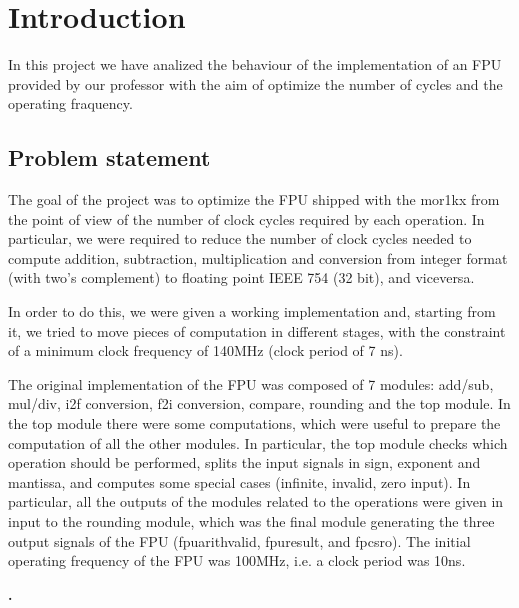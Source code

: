 \section{Introduction}
In this project we have analized the behaviour of the implementation of an FPU \cite{mor1kxcode} provided by our professor with the aim of optimize the number of cycles and the operating fraquency.


\subsection{Problem statement}
The goal of the project was to optimize the FPU shipped with the mor1kx from the point of view of the number of clock cycles required by each operation. In particular, we were required to reduce the number of clock cycles needed to compute addition, subtraction, multiplication and conversion from integer format (with two's complement) to floating point IEEE 754 (32 bit), and viceversa.

In order to do this, we were given a working implementation and, starting from it, we tried to move pieces of computation in different stages, with the constraint of a minimum clock frequency of 140MHz (clock period of 7 ns).

The original implementation of the FPU was composed of 7 modules: add/sub, mul/div, i2f conversion, f2i conversion, compare, rounding and the top module. In the top module there were some computations, which were useful to prepare the computation of all the other modules. In particular, the top module checks which operation should be performed, splits the input signals in sign, exponent and mantissa, and computes some special cases (infinite, invalid, zero input).
In particular, all the outputs of the modules related to the operations were given in input to the rounding module, which was the final module generating the three output signals of the FPU (fpu\textunderscore arith\textunderscore valid, fpu\textunderscore result, and fpcsr\textunderscore o). The initial operating frequency of the FPU was 100MHz, i.e. a clock period was 10ns.

\textbf{.}


